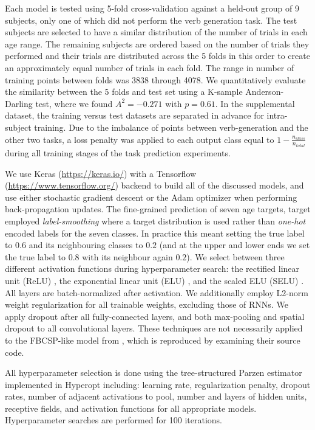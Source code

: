 \documentclass[fleqn,10pt]{wlscirep}
\begin{document}
Each model is tested using 5-fold cross-validation against a held-out group of 9 subjects, only one of which did not perform the verb generation task. The test subjects are selected to have a similar distribution of the number of trials in each age range. The remaining subjects are ordered based on the number of trials they performed and their trials are distributed across the 5 folds in this order to create an approximately equal number of trials in each fold. The range in number of training points between folds was 3838 through 4078. We quantitatively evaluate the similarity between the 5 folds and test set using a K-sample Anderson-Darling test, where we found $A^2=-0.271$ with $p=0.61$. In the supplemental dataset, the training versus test datasets are separated in advance for intra-subject training. Due to the imbalance of points between verb-generation and the other two tasks, a loss penalty was applied to each output class equal to $1-\frac{n_{class}}{n_{total}}$ during all training stages of the task prediction experiments.

We use Keras (\url{https://keras.io/}) with a Tensorflow (\url{https://www.tensorflow.org/}) backend to build all of the discussed models, and use either stochastic gradient descent or the Adam optimizer\cite{Kingma2015} when performing back-propagation updates. The fine-grained prediction of seven age targets, target employed {\em label-smoothing} \cite{Pereyra2017} where a target distribution is used rather than {\em one-hot} encoded labels for the seven classes. In practice this meant setting the true label to $0.6$ and its neighbouring classes to $0.2$ (and at the upper and lower ends we set the true label to $0.8$ with its neighbour again $0.2$). We select between three different activation functions during hyperparameter search: the rectified linear unit (ReLU) \cite{He2015a}, the exponential linear unit (ELU) \cite{Clevert}, and the scaled ELU (SELU) \cite{NIPS2017_6698}. All layers are batch-normalized \cite{Szegedy2015} after activation. We additionally employ L2-norm weight regularization for all trainable weights, excluding those of RNNs. We apply dropout \cite{Srivastava2014} after all fully-connected layers, and both max-pooling and spatial dropout \cite{Tompson2015} to all convolutional layers. These techniques are not necessarily applied to the FBCSP-like model from \cite{Schirrmeister2017}, which is reproduced by examining their source code.

All hyperparameter selection is done using the tree-structured Parzen estimator implemented in Hyperopt \cite{Bergstra2013} including: learning rate, regularization penalty, dropout rates, number of adjacent activations to pool, number and layers of hidden units, receptive fields, and activation functions for all appropriate models. Hyperparameter searches are performed for 100 iterations.
\end{document}
